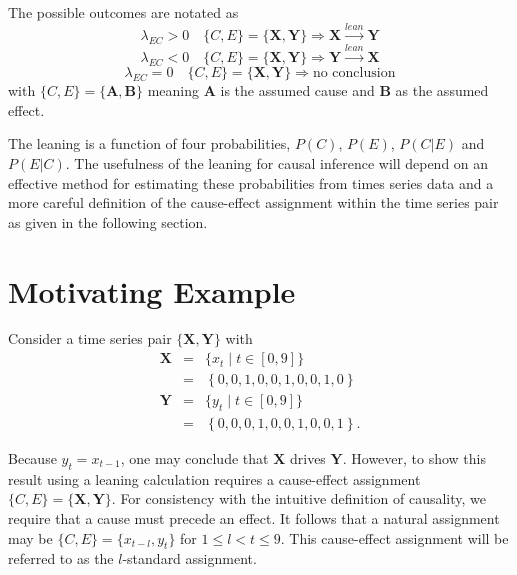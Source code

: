 \documentclass[twocolumn,aps,pre,groupedaddress]{revtex4-1}
\begin{document}
The possible outcomes are notated as
\begin{equation*}
\lambda_{EC}>0 \quad\{C,E\} = \{\mathbf{X},\mathbf{Y}\}\Rightarrow\mathbf{X}\xrightarrow{lean}\mathbf{Y}
\end{equation*}
\begin{equation*}
\lambda_{EC}<0\quad\{C,E\} = \{\mathbf{X},\mathbf{Y}\}\Rightarrow\mathbf{Y}\xrightarrow{lean}\mathbf{X}
\end{equation*}
\begin{equation*}
\lambda_{EC}=0\quad\{C,E\} = \{\mathbf{X},\mathbf{Y}\}\Rightarrow \mbox{no conclusion}
\end{equation*}
with $\{C,E\} = \{\mathbf{A},\mathbf{B}\}$ meaning $\mathbf{A}$ is the assumed cause and $\mathbf{B}$ as the assumed effect.

The leaning is a function of four probabilities, $P(C)$, $P(E)$, $P(C|E)$ and $P(E|C)$.  The usefulness of the leaning for causal inference will depend on an effective method for estimating these probabilities from times series data and a more careful definition of the cause-effect assignment within the time series pair as given in the following section.

\section{Motivating Example}
Consider a time series pair $\{\mathbf{X},\mathbf{Y}\}$ with
\begin{eqnarray*}
\mathbf{X} &=& \{x_t\; | \; t\in[0,9]\}\\
&=& \left\{0,0,1,0,0,1,0,0,1,0\right\}\\
\mathbf{Y} &=& \{y_t\; | \; t\in[0,9]\}\\
&=& \left\{0,0,0,1,0,0,1,0,0,1\right\}.
\end{eqnarray*}

Because $y_t=x_{t-1}$, one may conclude that $\mathbf{X}$ drives $\mathbf{Y}$.  However, to show this result using a leaning calculation requires a cause-effect assignment $\{C,E\}=\{\mathbf{X},\mathbf{Y}\}$. For consistency with the intuitive definition of causality, we require that a cause must precede an effect.  It follows that a natural assignment may be $\{C,E\}=\{x_{t-l},y_t\}$ for $1 \leq l < t \leq 9$.  This cause-effect assignment will be referred to as the $l$-standard assignment.
\end{document}
